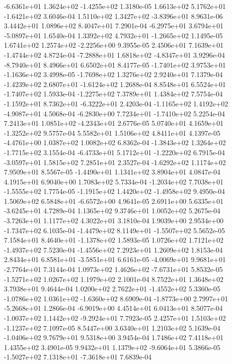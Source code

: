 -6.6361e+01  1.3624e+02 -1.4255e+02  1.3180e-05
 1.6613e+02  5.1762e+01 -1.6421e+02  3.6046e-04
 1.5110e+02  1.3427e+02 -3.8396e+01  8.9631e-06
3.4442e+01 1.0896e+02 8.4047e+01  7.2901e-04
-6.2975e+01  3.6794e+01 -5.0897e+01  1.6540e-04
 1.3392e+02  4.7932e+01 -1.2665e+02  1.1495e-05
 1.6741e+02  1.2574e+02 -2.2256e+00  9.3955e-05
 2.4506e+01  7.1639e+01 -1.4744e+02  4.8724e-04
-7.2888e+01  1.6818e+02 -4.8347e+01  3.9296e-04
-8.7940e+01  8.4966e+01  6.6502e+01  8.4177e-05
-1.7401e+02  3.9753e+01 -1.1636e+02  3.4998e-05
-1.7698e+02  1.3276e+02  2.9240e+01  7.1379e-04
-1.4239e+02  2.6807e+01 -1.6124e+02  1.2688e-04
 8.8548e+01  6.5524e+01 -1.7407e+02  1.5933e-04
-1.2275e+02  7.3789e+01  1.4384e+02  7.5754e-04
-1.1592e+01  8.7362e+01 -6.3222e+01  2.4203e-04
-1.1165e+02  1.4192e+02 -4.9087e+01  4.5068e-04
-6.2830e+00  7.7234e+01 -1.7410e+02  5.2254e-04
 7.2413e+01  1.0851e+02 -4.2343e+01  2.6776e-05
 5.0740e+01  4.1659e+01 -1.3252e+02  9.5757e-04
5.5582e+01 1.5106e+02 4.8411e+01  4.1397e-05
-4.4761e+00  1.0387e+02  1.0082e+02  6.8362e-04
-1.3843e+02  1.3264e+02 -1.7715e+02  3.1554e-04
-6.4733e+01  5.1712e+01 -1.2220e+02  6.7915e-04
-3.0597e+01  1.5815e+02  7.2851e+01  2.3527e-04
-1.6292e+02  1.1174e+02  7.9509e+01  8.5567e-05
-1.4490e+01  1.1341e+02  3.8904e+01  4.0847e-04
4.1915e+01 6.9040e+00 1.7083e+02  5.7334e-04
-1.2034e+02  7.7038e+01 -1.5555e+02  1.7754e-05
-1.1915e+02  1.4420e+02 -1.4958e+02  9.4950e-04
 1.5069e+02  6.5848e+01 -6.6572e+00  4.9641e-05
 2.6911e+00  5.6335e+01 -3.6245e+01  4.7289e-04
1.1365e+02 9.3746e+01 1.0052e+02  5.2675e-04
-3.7263e+01  1.1177e+02  4.3022e+01  3.1810e-04
 1.9039e+00  2.9534e+00 -1.7347e+02  6.1035e-04
-1.4479e+02  8.1149e+01 -1.5507e+02  5.5652e-05
 7.1584e+01  8.4640e+01 -1.1378e+02  1.5893e-05
 1.0726e+02  1.7121e+02 -1.4937e+02  7.5230e-04
-1.4556e+02  7.2923e+01  1.2609e+02  1.8153e-04
 2.8434e+01  6.8581e+01 -3.5851e+01  6.6161e-05
-4.0069e+01  9.9681e+01 -2.7764e+01  7.3144e-04
 1.0973e+02  1.4626e+02 -7.6731e+01  5.8532e-05
-1.5271e+02  1.0267e+02  1.1979e+02  2.1001e-04
8.7522e+01 1.3648e+02 3.7938e+01  9.4644e-04
 1.0200e+02  2.7622e+01 -1.4552e+02  5.3360e-05
-1.0786e+02  1.0361e+02 -1.6360e+02  8.6909e-04
-1.8773e+00  2.7997e+01 -5.2668e+01  1.2866e-04
-6.9019e+00  4.4514e+01  6.0413e+01  8.5077e-04
-1.0037e+02  1.1442e+02 -9.2924e+01  7.7923e-05
 2.4257e+01  1.5103e+02 -1.1237e+02  7.1097e-05
8.5447e+00 3.6340e+01 1.2103e+02  5.1639e-04
-1.0406e+02  9.7679e+01  9.5318e+00  3.9454e-04
1.7486e+02 7.4118e+01 1.4355e+02  3.4901e-05
 9.9432e+01  1.1379e+02 -9.6064e+01  5.3866e-05
-1.5027e+02  7.1318e+01 -7.3618e+01  7.6839e-04
